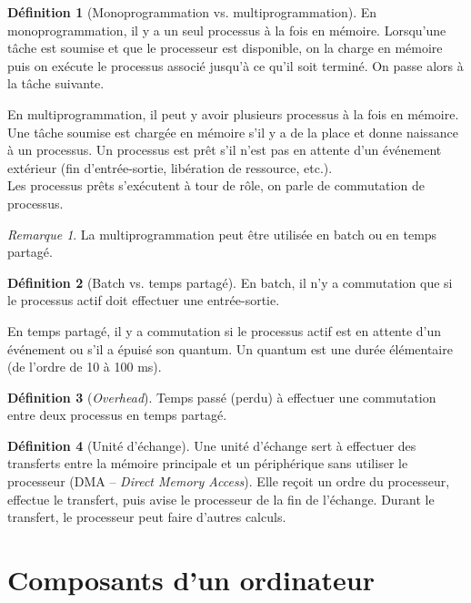 \documentclass[11pt,english,french]{scrreprt}
\theoremstyle{remark}
\newtheorem*{rem*}{Remarque}
\theoremstyle{definition}
\newtheorem*{def*}{Définition}
\begin{document}
\begin{def*}[Monoprogrammation vs. multiprogrammation]
	En monoprogrammation, il y a un seul processus à la fois en mémoire. Lorsqu'une tâche est soumise et que le processeur est disponible, on la charge en mémoire puis on exécute le processus associé jusqu'à ce qu'il soit terminé. On passe alors à la tâche suivante.
	
	En multiprogrammation, il peut y avoir plusieurs processus à la fois en mémoire. Une tâche soumise est chargée en mémoire s'il y a de la place et donne naissance à un processus. Un processus est prêt s'il n'est pas en attente d'un événement extérieur (fin d’entrée-sortie, libération de ressource, etc.). \\
	Les processus prêts s'exécutent à tour de rôle, on parle de commutation de processus. 
	\begin{rem*}
		La multiprogrammation peut être utilisée en batch ou en temps partagé.
	\end{rem*}
\end{def*}

\begin{def*}[Batch vs. temps partagé]
	En batch, il n'y a commutation que si le processus actif doit effectuer une entrée-sortie. 
	
	En temps partagé, il y a commutation si le processus actif est en attente d’un événement ou	s'il a épuisé son quantum. Un quantum est une durée élémentaire (de l'ordre de 10 à 100 ms).
\end{def*}

\begin{def*}[\emph{Overhead}]
	Temps passé (perdu) à effectuer une commutation entre deux processus en temps partagé.
\end{def*}

\begin{def*}[Unité d'échange]
	Une unité d'échange sert à effectuer des transferts entre la mémoire principale et un périphérique sans utiliser le processeur (DMA -- \emph{Direct Memory Access}). Elle reçoit un ordre du processeur, effectue le transfert, puis avise le processeur de la fin de l'échange. Durant le transfert, le processeur peut faire d'autres calculs.
\end{def*}

\clearpage

\section{Composants d'un ordinateur} %
\end{document}
